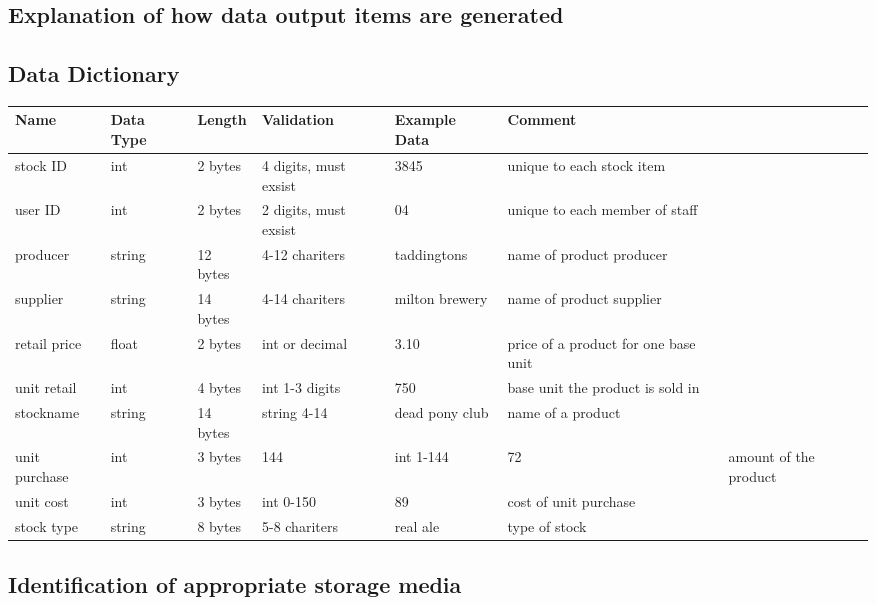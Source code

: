 \subsection{Explanation of how data output items are generated}

\subsection{Data Dictionary}
\begin{center}
\begin{tabular}{|l|l|l|l|l|l|}
    \hline
    \textbf{Name} & \textbf{Data Type} & \textbf{Length} & \textbf{Validation} & \textbf{Example Data} & \textbf{Comment} \\ \hline
	stock ID & int & 2 bytes & 4 digits, must exsist & 3845 & unique to each stock item\\ \hline
	user ID & int & 2 bytes & 2 digits, must exsist & 04 & unique to each member of staff\\ \hline
	producer & string & 12 bytes & 4-12 chariters & taddingtons & name of product producer\\ \hline
	supplier & string & 14 bytes & 4-14 chariters & milton brewery & name of product supplier \\ \hline
	retail price & float & 2 bytes & int or decimal & 3.10 & price of a product for one base unit\\ \hline
	unit retail & int & 4 bytes & int 1-3 digits & 750 & base unit the product is sold in\\ \hline
	stockname & string & 14 bytes & string 4-14 & dead pony club & name of a product\\ \hline
	unit purchase & int & 3 bytes & 144 & int 1-144 & 72 & amount of the product\\ \hline
	unit cost & int & 3 bytes & int 0-150 & 89 & cost of unit purchase\\ \hline
	stock type & string & 8 bytes & 5-8 chariters & real ale & type of stock\\ \hline
	 
\end{tabular}
\label{tab:range_examples}
\end{center}

\subsection{Identification of appropriate storage media}

  


